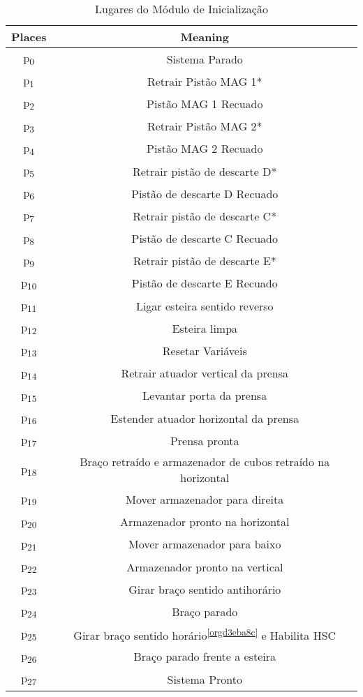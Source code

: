 \begin{table}[htbp]
\caption{Lugares do Módulo de Inicialização}
\centering
\begin{tabular}{c|c}
Places & Meaning\\
\hline
p\textsubscript{0} & Sistema Parado\\
p\textsubscript{1} & Retrair Pistão MAG 1*\\
p\textsubscript{2} & Pistão MAG 1 Recuado\\
p\textsubscript{3} & Retrair Pistão MAG 2*\\
p\textsubscript{4} & Pistão MAG 2 Recuado\\
p\textsubscript{5} & Retrair pistão de descarte D*\\
p\textsubscript{6} & Pistão de descarte D Recuado\\
p\textsubscript{7} & Retrair pistão de descarte C*\\
p\textsubscript{8} & Pistão de descarte C Recuado\\
p\textsubscript{9} & Retrair pistão de descarte E*\\
p\textsubscript{10} & Pistão de descarte E Recuado\\
p\textsubscript{11} & Ligar esteira sentido reverso\\
p\textsubscript{12} & Esteira limpa\\
p\textsubscript{13} & Resetar Variáveis\footnotemark\\
p\textsubscript{14} & Retrair atuador vertical da prensa\\
p\textsubscript{15} & Levantar porta da prensa\\
p\textsubscript{16} & Estender atuador horizontal da prensa\\
p\textsubscript{17} & Prensa pronta\\
p\textsubscript{18} & Braço retraído e armazenador de cubos retraído na horizontal\\
p\textsubscript{19} & Mover armazenador para direita\\
p\textsubscript{20} & Armazenador pronto na horizontal\\
p\textsubscript{21} & Mover armazenador para baixo\\
p\textsubscript{22} & Armazenador pronto na vertical\\
p\textsubscript{23} & Girar braço sentido antihorário\footnotemark\\
p\textsubscript{24} & Braço parado\\
p\textsubscript{25} & Girar braço sentido horário\textsuperscript{\ref{orgd3eba8c}} e Habilita HSC\\
p\textsubscript{26} & Braço parado frente a esteira\\
p\textsubscript{27} & Sistema Pronto\\
\end{tabular}
\end{table}

